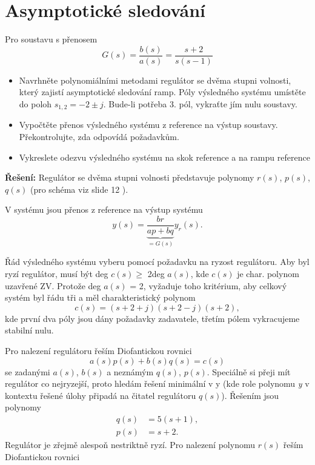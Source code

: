 \documentclass[twoside]{article}
\begin{document}
\section{Asymptotické sledování}
Pro soustavu s přenosem
\begin{equation}
	\label{eq:prenos}
	G(s) = \frac{b(s)}{a(s)} = \frac{s+2}{s(s-1)}
\end{equation}

\begin{itemize}
	\item  Navrhněte polynomiálními metodami regulátor se dvěma stupni volnosti, který zajistí asymptotické
	sledování ramp. Póly výsledného systému umístěte do poloh $s_{1,2} = -2 \pm j$. Bude-li potřeba 3. pól, vykraťte
	jím nulu soustavy.
 	\item Vypočtěte přenos výsledného systému z reference na výstup soustavy. Překontrolujte, zda odpovídá
	požadavkům.
	\item Vykreslete odezvu výsledného systému na skok reference a na rampu reference
\end{itemize}

\textbf{Řešení:} 
Regulátor se dvěma stupni volnosti představuje polynomy $r(s)$, $p(s)$, $q(s)$ (pro schéma viz slide 12 \cite{sebek}).

V systému jsou přenos z reference na výstup systému
\begin{equation}
	y(s) = \underbrace{\frac{br}{ap+bq}}_{=G(s)}  y_r(s).
\end{equation}

Řád výsledného systému vyberu pomocí požadavku na ryzost regulátoru. Aby byl ryzí regulátor,
musí být deg $c(s) \ge$ 2deg $a(s)$, kde $c(s)$ je char. polynom uzavřené ZV. 
Protože deg $a(s)$ = 2, vyžaduje toho kritérium, aby celkový systém byl řádu tři a měl charakteristický polynom
\begin{equation}
	c(s) = (s + 2 + j)(s + 2 - j)(s+2),
\end{equation}
kde první dva póly jsou dány požadavky zadavatele, třetím pólem vykracujeme stabilní nulu.

Pro nalezení regulátoru řeším Diofantickou rovnici
\begin{equation}
	a(s)p(s) + b(s)q(s) = c(s)
\end{equation}
se zadanými $a(s)$, $b(s)$ a neznámým $q(s)$, $p(s)$. Speciálně si přeji mít regulátor co nejryzejší,
proto hledám řešení minimální v y (kde role polynomu \textit{y} v kontextu řešené úlohy připadá na čitatel regulátoru $q(s)$).
Řešením jsou polynomy
\begin{equation}
	\begin{aligned}
		q(s) &= 5(s+1), \\
		p(s) &= s+2.
	\end{aligned}
\end{equation}
Regulátor je zřejmě alespoň nestriktně ryzí. Pro nalezení polynomu $r(s)$ řeším Diofantickou rovnici
\end{document}

